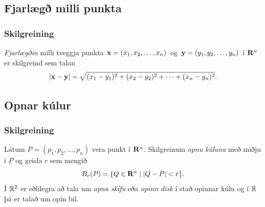 \begin{figure} [h]
\begin {center}  \end {center}
\end {figure}  


\subsection{Fjarlægð milli punkta}
\subsubsection{Skilgreining }
 {\em Fjarlægðin} milli tveggja punkta 
$\mbox{${\bf x}$}=(x_1,x_2, \ldots,x_n)$ og $\mbox{${\bf y}$}=(y_1,y_2, \ldots,y_n)$ í $\mbox{${\bf R}^n$}$ er skilgreind sem talan
$$|\mbox{${\bf x}$}-\mbox{${\bf y}$}|=\sqrt{(x_1-y_1)^2+(x_2-y_2)^2+\cdots+(x_n-y_n)^2}.$$
 



\subsection{Opnar kúlur}
 \subsubsection{Skilgreining }
  Látum $P=(p_1,p_2,\ldots,p_n)$ vera punkt í
$\mbox{${\bf R}^n$}$.  Skilgreinum {\em opnu kúluna} með miðju í $P$ og geisla $r$ sem
mengið  
$$B_r(P)=\{Q\in\mbox{${\bf R}^n$}\mid |Q-P|<r\}.$$
Í ${\mathbb R}^2$ er eðlilegra að tala um {\em opna skífu} eða {\em opinn disk} í stað opinnar kúlu og í ${\mathbb R}$ þá er talað um opin bil.  

